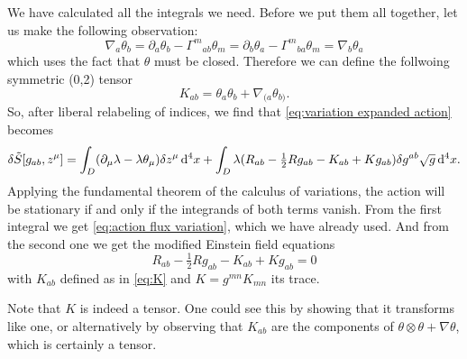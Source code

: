 \documentclass[../main.tex]{subfiles}
\begin{document}
We have calculated all the integrals we need. Before we put them all together, let us make
the following observation:
\begin{equation*}
	\nabla_a \theta_b = \partial_a \theta_b - {\Gamma^m}_{ab} \theta_m = \partial_b \theta_a
	- {\Gamma^m}_{ba} \theta_m = \nabla_b \theta_a
\end{equation*}
which uses the fact that \( \theta \) must be closed. Therefore we can define the
follwoing symmetric (0,2) tensor
\begin{equation} \label{eq:K}
	K_{ab} = \theta_a\theta_b + \nabla_{(a}\theta_{b)}. 
\end{equation}
So, after liberal relabeling of indices, we find that \cref{eq:variation expanded action}
becomes
\begin{equation} \label{eq:final variation of action}
	\delta\tilde{S}[g_{ab}, z^\mu] = \int_D(\partial_\mu \lambda - \lambda \theta_\mu)
	\delta z^\mu \,\mathrm{d}^4 x + \int_D \lambda (R_{ab} - \tfrac{1}{2} Rg_{ab} - K_{ab} +
	Kg_{ab})\delta g^{ab} \sqrt{g} \,\mathrm{d}^4 x.
\end{equation}
Applying the fundamental theorem of the calculus of variations, the action will be
stationary if and only if the integrands of both terms vanish. From the first integral we
get \cref{eq:action flux variation}, which we have already used. And from the second one
we get the modified Einstein field equations
\begin{equation} \label{eq:modified EFE}
	R_{ab} - \tfrac{1}{2}Rg_{ab} - K_{ab} + Kg_{ab} = 0
\end{equation}
with \( K_{ab} \) defined as in \cref{eq:K} and \( K = g^{mn}K_{mn} \) its trace. 

Note that \( K \) is indeed a tensor. One could see this by showing that it transforms
like one, or alternatively by observing that \( K_{ab} \) are the components of \( \theta
\otimes \theta + \nabla \theta \), which is certainly a tensor. 
\end{document}
